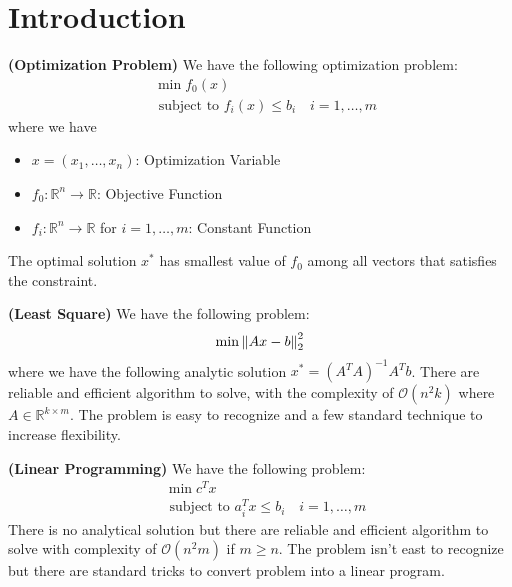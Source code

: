 \section{Introduction}

\begin{definition}{\textbf{(Optimization Problem)}}
    We have the following optimization problem:
    \begin{equation*}
    \begin{aligned}
        &\min f_0(x) \\
        &\text{ subject to } f_i(x) \le b_i \quad i=1,\dots,m 
    \end{aligned}
    \end{equation*}
    where we have
    \begin{itemize}
        \item $x = (x_1, \dots, x_n)$: Optimization Variable
        \item $f_0:\mathbb{R}^n\rightarrow \mathbb{R}$: Objective Function
        \item $f_i:\mathbb{R}^n\rightarrow \mathbb{R}$ for $i=1,\dots,m$: Constant Function
    \end{itemize} 
    The optimal solution $x^*$ has smallest value of $f_0$ among all vectors that satisfies the constraint.
\end{definition}

\begin{definition}{\textbf{(Least Square)}}
    We have the following problem:
    \begin{equation*}
        \min \left\lVert Ax - b\right\rVert^2_2
    \end{equation*}
    where we have the following analytic solution $x^* = (A^TA)^{-1}A^Tb$. There are reliable and efficient algorithm to solve, with the complexity of $\mathcal{O}(n^2k)$ where $A\in \mathbb{R}^{k\times m}$. The problem is easy to recognize and a few standard technique to increase flexibility. 
\end{definition}

\begin{definition}{\textbf{(Linear Programming)}}
    We have the following problem:
    \begin{equation*}
    \begin{aligned}
        &\min c^Tx \\ 
        &\text{ subject to } a_i^Tx \le b_i \quad i=1,\dots,m
    \end{aligned}
    \end{equation*}
    There is no analytical solution but there are reliable and efficient algorithm to solve with complexity of $\mathcal{O}(n^2m)$ if $m\ge n$. The problem isn't east to recognize but there are standard tricks to convert problem into a linear program. 
\end{definition}

